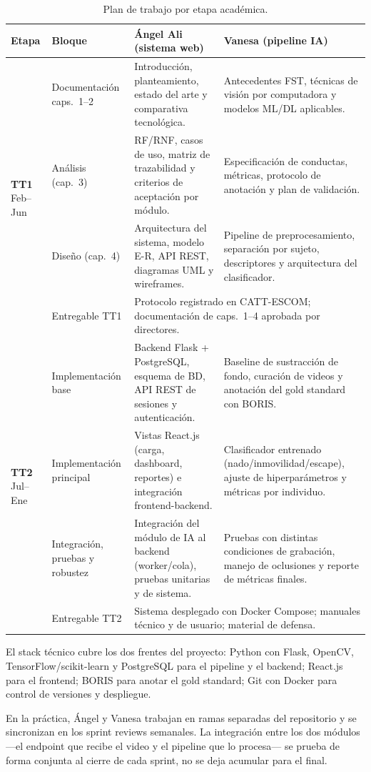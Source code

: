 \begin{table}[ht]
\centering
\caption{Plan de trabajo por etapa académica.}
\label{tab:plan_trabajo}
\small
\begin{tabular}{|p{1.0cm}|p{3.8cm}|p{4.0cm}|p{4.0cm}|}
\hline
\textbf{Etapa} & \textbf{Bloque} & \textbf{Ángel Ali (sistema web)} & \textbf{Vanesa (pipeline IA)} \\
\hline
\multirow{4}{*}{\textbf{TT1} \newline Feb--Jun}
  & Documentación caps.~1--2
  & Introducción, planteamiento, estado del arte y comparativa tecnológica.
  & Antecedentes FST, técnicas de visión por computadora y modelos ML/DL aplicables. \\
\cline{2-4}
  & Análisis (cap.~3)
  & RF/RNF, casos de uso, matriz de trazabilidad y criterios de aceptación por módulo.
  & Especificación de conductas, métricas, protocolo de anotación y plan de validación. \\
\cline{2-4}
  & Diseño (cap.~4)
  & Arquitectura del sistema, modelo E-R, API REST, diagramas UML y wireframes.
  & Pipeline de preprocesamiento, separación por sujeto, descriptores y arquitectura del clasificador. \\
\cline{2-4}
  & Entregable TT1
  & \multicolumn{2}{p{8.0cm}|}{Protocolo registrado en CATT-ESCOM; documentación de caps.~1--4 aprobada por directores.} \\
\hline
\multirow{4}{*}{\textbf{TT2} \newline Jul--Ene}
  & Implementación base
  & Backend Flask + PostgreSQL, esquema de BD, API REST de sesiones y autenticación.
  & Baseline de sustracción de fondo, curación de videos y anotación del gold standard con BORIS. \\
\cline{2-4}
  & Implementación principal
  & Vistas React.js (carga, dashboard, reportes) e integración frontend-backend.
  & Clasificador entrenado (nado/inmovilidad/escape), ajuste de hiperparámetros y métricas por individuo. \\
\cline{2-4}
  & Integración, pruebas y robustez
  & Integración del módulo de IA al backend (worker/cola), pruebas unitarias y de sistema.
  & Pruebas con distintas condiciones de grabación, manejo de oclusiones y reporte de métricas finales. \\
\cline{2-4}
  & Entregable TT2
  & \multicolumn{2}{p{8.0cm}|}{Sistema desplegado con Docker Compose; manuales técnico y de usuario; material de defensa.} \\
\hline
\end{tabular}
\end{table}

El stack técnico cubre los dos frentes del proyecto: Python con Flask, OpenCV,
TensorFlow/scikit-learn y PostgreSQL para el pipeline y el backend; React.js para
el frontend; BORIS para anotar el gold standard; Git con Docker para control de
versiones y despliegue.

En la práctica, Ángel y Vanesa trabajan en ramas separadas del repositorio y se
sincronizan en los sprint reviews semanales. La integración entre los dos módulos
---el endpoint que recibe el video y el pipeline que lo procesa--- se prueba de forma
conjunta al cierre de cada sprint, no se deja acumular para el final.